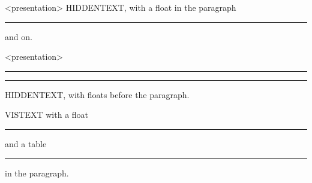 \documentclass[a4paper]{memoir}
\begin{document}
\begin{frame}<presentation>
  HIDDENTEXT, with a float in the paragraph
  \begin{marginfigure}
    \rule{2cm}{1cm}
    \caption{HIDDENPAR}
  \end{marginfigure}
  and on.
\end{frame}
\begin{frame}<presentation>
  \begin{marginfigure}
    \rule{2cm}{1cm}
    \caption{HIDDENV}
  \end{marginfigure}
  \begin{margintable}
    \caption{HIDDENTAB}
    \rule{2cm}{1cm}
  \end{margintable}
  HIDDENTEXT, with floats before the paragraph.
\end{frame}
\begin{frame}
  VISTEXT with a float
  \begin{marginfigure}
    \rule{2cm}{1cm}
    \caption{VISIBLE}
  \end{marginfigure}
  and a table
  \begin{margintable}
    \caption{TABVISIBLE}
    \rule{2cm}{1cm}
  \end{margintable}
  in the paragraph.
\end{frame}
\end{document}
